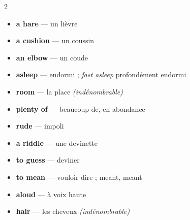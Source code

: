 \documentclass[troisieme]{fiche}
\begin{document}
\begin{multicols}{2}\small
\begin{itemize}[label=--,itemsep=0.8mm,leftmargin=*]
  \item \textbf{a hare} — un lièvre
  \item \textbf{a cushion} — un coussin
  \item \textbf{an elbow} — un coude
  \item \textbf{asleep} — endormi ; \textit{fast asleep} profondément endormi
  \item \textbf{room} — la place \textit{(indénombrable)}
  \item \textbf{plenty of} — beaucoup de, en abondance
  \item \textbf{rude} — impoli
  \item \textbf{a riddle} — une devinette
  \item \textbf{to guess} — deviner
  \item \textbf{to mean} — vouloir dire ; meant, meant
  \item \textbf{aloud} — à voix haute
  \item \textbf{hair} — les cheveux \textit{(indénombrable)}
\end{itemize}
\end{multicols}
\end{document}
